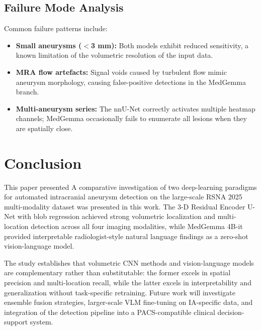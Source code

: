 \documentclass[journal]{IEEEtran}
\begin{document}
\subsection{Failure Mode Analysis}

Common failure patterns include:
\begin{itemize}
  \item \textbf{Small aneurysms ($<$3 mm):} Both models exhibit reduced
        sensitivity, a known limitation of the volumetric resolution of the
        input data.
  \item \textbf{MRA flow artefacts:} Signal voids caused by turbulent flow
        mimic aneurysm morphology, causing false-positive detections in the
        MedGemma branch.
  \item \textbf{Multi-aneurysm series:} The nnU-Net correctly activates
        multiple heatmap channels; MedGemma occasionally fails to enumerate
        all lesions when they are spatially close.
\end{itemize}

\balance  %
\section{Conclusion}
\label{sec:conclusion}

This paper presented A comparative investigation of two deep-learning paradigms
for automated intracranial aneurysm detection on the large-scale RSNA 2025
multi-modality dataset was presented in this work. The 3-D Residual Encoder U-Net with blob regression
achieved strong volumetric localization and multi-location detection across all
four imaging modalities, while MedGemma 4B-it provided interpretable
radiologist-style natural language findings as a zero-shot vision-language model.

The study establishes that volumetric CNN methods and vision-language models
are complementary rather than substitutable: the former excels in spatial
precision and multi-location recall, while the latter excels in interpretability
and generalization without task-specific retraining. Future work will investigate
ensemble fusion strategies, larger-scale VLM fine-tuning on IA-specific data,
and integration of the detection pipeline into a PACS-compatible clinical
decision-support system.

\appendix
\end{document}
